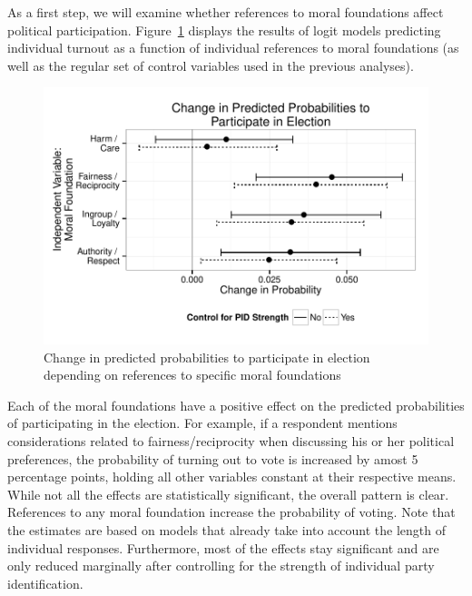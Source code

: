 \documentclass[12pt]{article}
\begin{document}
As a first step, we will examine whether references to moral foundations affect political participation. Figure~\ref{fig:5turnout} displays the results of logit models predicting individual turnout as a function of individual references to moral foundations (as well as the regular set of control variables used in the previous analyses).

\begin{figure}[ht]\centering
\includegraphics{../calc/fig/fig5turnout.pdf}
\caption{Change in predicted probabilities to participate in election depending on references to specific moral foundations}\label{fig:5turnout}
\end{figure}

Each of the moral foundations have a positive effect on the predicted probabilities of participating in the election. For example, if a respondent mentions considerations related to fairness/reciprocity when discussing his or her political preferences, the probability of turning out to vote is increased by amost 5 percentage points, holding all other variables constant at their respective means. While not all the effects are statistically significant, the overall pattern is clear. References to any moral foundation increase the probability of voting. Note that the estimates are based on models that already take into account the length of individual responses. Furthermore, most of the effects stay significant and are only reduced marginally after controlling for the strength of individual party identification.
\end{document}
